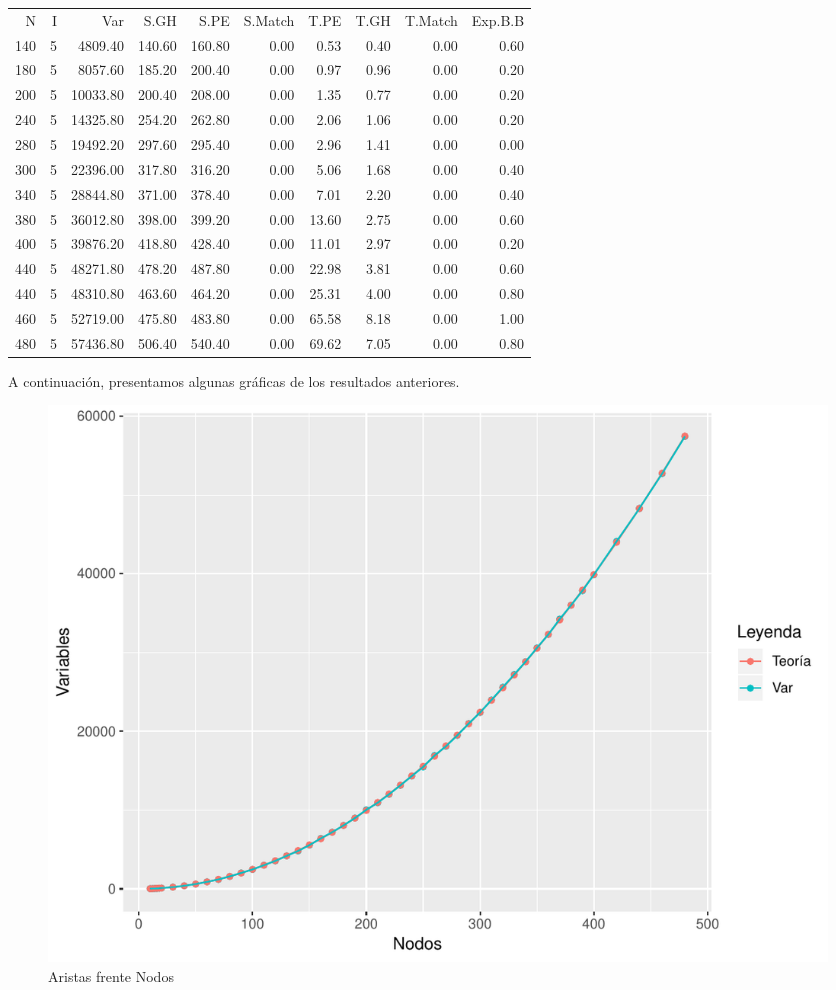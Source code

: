 \documentclass[twoside,a4paper,openright,12pt]{book}
\begin{document}
\begin{table}[h]
\centering
\begin{tabular}{rrrrrrrrrr}
  \hline
N & I & Var & S.GH & S.PE & S.Match & T.PE & T.GH & T.Match & Exp.B.B \\ 

  140 &   5 & 4809.40 & 140.60 & 160.80 & 0.00 & 0.53 & 0.40 & 0.00 & 0.60 \\ 
  180 &   5 & 8057.60 & 185.20 & 200.40 & 0.00 & 0.97 & 0.96 & 0.00 & 0.20 \\ 
  200 &   5 & 10033.80 & 200.40 & 208.00 & 0.00 & 1.35 & 0.77 & 0.00 & 0.20 \\ 
  240 &   5 & 14325.80 & 254.20 & 262.80 & 0.00 & 2.06 & 1.06 & 0.00 & 0.20 \\ 
  280 &   5 & 19492.20 & 297.60 & 295.40 & 0.00 & 2.96 & 1.41 & 0.00 & 0.00 \\ 
  300 &   5 & 22396.00 & 317.80 & 316.20 & 0.00 & 5.06 & 1.68 & 0.00 & 0.40 \\ 
  340 &   5 & 28844.80 & 371.00 & 378.40 & 0.00 & 7.01 & 2.20 & 0.00 & 0.40 \\ 
  380 &   5 & 36012.80 & 398.00 & 399.20 & 0.00 & 13.60 & 2.75 & 0.00 & 0.60 \\ 
  400 &   5 & 39876.20 & 418.80 & 428.40 & 0.00 & 11.01 & 2.97 & 0.00 & 0.20 \\ 
  440 &   5 & 48271.80 & 478.20 & 487.80 & 0.00 & 22.98 & 3.81 & 0.00 & 0.60 \\ 
  440 &   5 & 48310.80 & 463.60 & 464.20 & 0.00 & 25.31 & 4.00 & 0.00 & 0.80 \\ 
  460 &   5 & 52719.00 & 475.80 & 483.80 & 0.00 & 65.58 & 8.18 & 0.00 & 1.00 \\ 
  480 &   5 & 57436.80 & 506.40 & 540.40 & 0.00 & 69.62 & 7.05 & 0.00 & 0.80 \\ 
  \hline
 \end{tabular}
 \end{table}
A continuación, presentamos algunas gráficas de los resultados anteriores.

\begin{figure}[h]
\centering
\includegraphics[scale=0.6]{plot1}
\caption{Aristas frente Nodos}
\end{figure}
\end{document}
